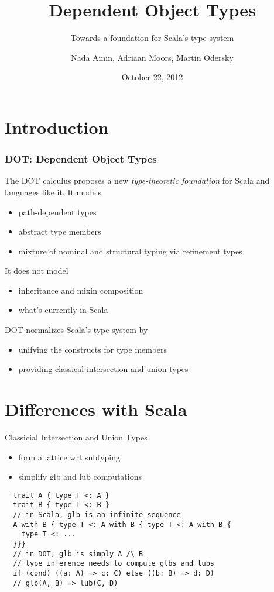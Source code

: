\documentclass{beamer}
\title{Dependent Object Types}
\subtitle{Towards a foundation for Scala's type system}
\author{Nada Amin, Adriaan Moors, Martin Odersky}
\institute{FOOL 2012}
\date{October 22, 2012}
\begin{document}
\frame{\titlepage}

\section{Introduction}

\begin{frame}
\frametitle{DOT: Dependent Object Types}

The DOT calculus proposes a new \emph{type-theoretic foundation} for Scala
and languages like it. It models
\begin{itemize}
\item path-dependent types
\item abstract type members
\item mixture of nominal and structural typing via refinement types
\end{itemize}

It does not model
\begin{itemize}
\item inheritance and mixin composition
\item what's currently in Scala
\end{itemize}

DOT normalizes Scala's type system by
\begin{itemize}
\item unifying the constructs for type members
\item providing classical intersection and union types
\end{itemize}

\end{frame}

\section{Differences with Scala}

\begin{frame}[fragile]{Classicial Intersection and Union Types}
\begin{itemize}
\item form a lattice wrt subtyping
\item simplify glb and lub computations
\end{itemize}
\begin{verbatim}
  trait A { type T <: A }
  trait B { type T <: B }
  // in Scala, glb is an infinite sequence
  A with B { type T <: A with B { type T <: A with B {
    type T <: ...
  }}}
  // in DOT, glb is simply A /\ B
  // type inference needs to compute glbs and lubs
  if (cond) ((a: A) => c: C) else ((b: B) => d: D)
  // glb(A, B) => lub(C, D)
\end{verbatim}

\end{frame}
\end{document}
